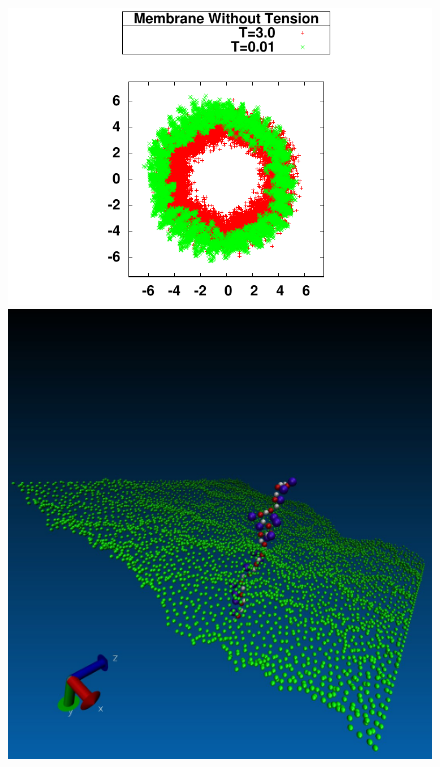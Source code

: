 \begin{figure}[H]
\begin{center}
\begin{minipage}{0.7\linewidth}
\includegraphics[width=1.2\textwidth]{2dmembranepressure.pdf} 
\end{minipage}
\begin{minipage}{0.29\linewidth}
\includegraphics[width=1.1\textwidth]{membranesouspression.jpg}
\end{minipage}

\end{center}
\end{figure}
